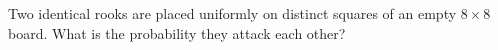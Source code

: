 Two identical rooks are placed uniformly on distinct squares of an empty $8\times8$ board. What is the probability they attack each other?
